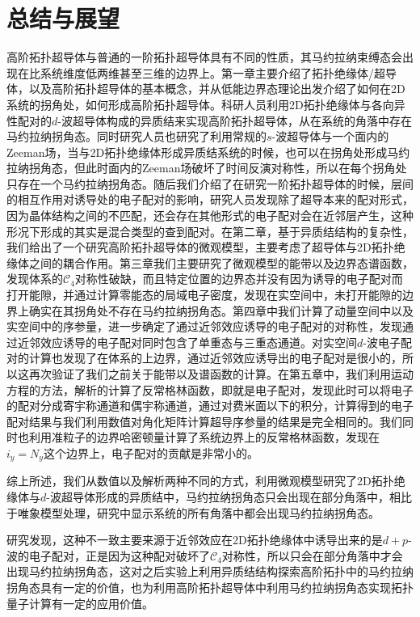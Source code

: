 \section{总结与展望}
高阶拓扑超导体与普通的一阶拓扑超导体具有不同的性质，其马约拉纳束缚态会出现在比系统维度低两维甚至三维的边界上。第一章主要介绍了拓扑绝缘体/超导体，以及高阶拓扑超导体的基本概念，并从低能边界态理论出发介绍了如何在2D系统的拐角处，如何形成高阶拓扑超导体。科研人员利用2D拓扑绝缘体与各向异性配对的$d$-波超导体构成的异质结来实现高阶拓扑超导体，从在系统的角落中存在马约拉纳拐角态。同时研究人员也研究了利用常规的$s$-波超导体与一个面内的Zeeman场，当与2D拓扑绝缘体形成异质结系统的时候，也可以在拐角处形成马约拉纳拐角态，但此时面内的Zeeman场破坏了时间反演对称性，所以在每个拐角处只存在一个马约拉纳拐角态。随后我们介绍了在研究一阶拓扑超导体的时候，层间的相互作用对诱导处的电子配对的影响，研究人员发现除了超导本来的配对形式，因为晶体结构之间的不匹配，还会存在其他形式的电子配对会在近邻层产生，这种形况下形成的其实是混合类型的查到配对。在第二章，基于异质结结构的复杂性，我们给出了一个研究高阶拓扑超导体的微观模型，主要考虑了超导体与2D拓扑绝缘体之间的耦合作用。第三章我们主要研究了微观模型的能带以及边界态谱函数，发现体系的$\mathcal{C}_4$对称性破缺，而且特定位置的边界态并没有因为诱导的电子配对而打开能隙，并通过计算零能态的局域电子密度，发现在实空间中，未打开能隙的边界上确实在其拐角处不存在马约拉纳拐角态。第四章中我们计算了动量空间中以及实空间中的序参量，进一步确定了通过近邻效应诱导的电子配对的对称性，发现通过近邻效应诱导的电子配对同时包含了单重态与三重态通道。对实空间$d$-波电子配对的计算也发现了在体系的上边界，通过近邻效应诱导出的电子配对是很小的，所以这再次验证了我们之前关于能带以及谱函数的计算。在第五章中，我们利用运动方程的方法，解析的计算了反常格林函数，即就是电子配对，发现此时可以将电子的配对分成寄宇称通道和偶宇称通道，通过对费米面以下的积分，计算得到的电子配对结果与我们利用数值对角化矩阵计算超导序参量的结果是完全相同的。我们同时也利用准粒子的边界哈密顿量计算了系统边界上的反常格林函数，发现在$i_y=N_y$这个边界上，电子配对的贡献是非常小的。

综上所述，我们从数值以及解析两种不同的方式，利用微观模型研究了2D拓扑绝缘体与$d$-波超导体形成的异质结中，马约拉纳拐角态只会出现在部分角落中，相比于唯象模型处理，研究中显示系统的所有角落中都会出现马约拉纳拐角态。

研究发现，这种不一致主要来源于近邻效应在2D拓扑绝缘体中诱导出来的是$d+p$-波的电子配对，正是因为这种配对破坏了$\mathcal{C}_4$对称性，所以只会在部分角落中才会出现马约拉纳拐角态，这对之后实验上利用异质结结构探索高阶拓扑中的马约拉纳拐角态具有一定的价值，也为利用高阶拓扑超导体中利用马约拉纳拐角态实现拓扑量子计算有一定的应用价值。



